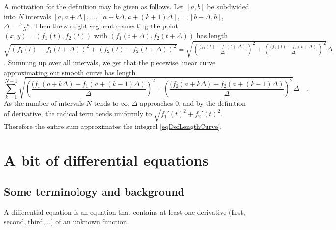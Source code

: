 \documentclass[12pt]{book}
\newcommand{\diff}{\text{d}}
\newcommand{\optionalDisplay}[1]{}
\begin{document}
A motivation for the definition may be given as follows. Let $[a,b]$ be subdivided into $N$ intervals $[a,a+\Delta ], \dots, [a+k\Delta, a+(k+1)\Delta],\dots, [b-\Delta, b]$, $\Delta=\frac{b-a}{N}$. Then the straight segment connecting the point $(x,y)=(f_1(t), f_2(t))$ with $(f_1(t+\Delta), f_2(t+\Delta))$ has length $\sqrt{(f_1(t)-f_1(t+\Delta))^2 + (f_2(t)-f_2(t+\Delta))^2}= \sqrt{\left(\frac{(f_1(t)-f_1(t+\Delta)}{\Delta}\right)^2 + \left(\frac{(f_2(t)- f_2(t+\Delta)}{\Delta} \right)^2}\Delta$. Summing up over all intervals, we get that the piecewise linear curve approximating our smooth curve has length
\[
\sum_{k=1}^{N-1} \sqrt{\left(\frac{(f_1(a+k\Delta)-f_1(a+(k-1)\Delta)}{\Delta}\right)^2 + \left(\frac{(f_2(a+k\Delta)- f_2(a+(k-1)\Delta)}{\Delta} \right)^2}\Delta\quad .
\]
As the number of intervals $N$ tends to $\infty$, $\Delta$ approaches 0, and by the definition of derivative, the radical term tends uniformly to $\sqrt{f_1'(t)^2+f_2'(t)^2}$. Therefore the entire sum approximates the integral \eqref{eqDefLengthCurve}.

\optionalDisplay{
\psset{xunit=1cm,yunit=1cm}
\begin{pspicture}(-1,-1)(4,4.3)
\psaxes[ ticks=none, arrows={->}](0,0)(4,4)
\rput[b](0,4.1){\tiny$y$}
\rput[b](4.1,0){\tiny$x$}

\psplot[linecolor=blue, plotstyle=curve]{0.2}{4} { x 2 div x 180 mul  sin 1 add  mul 1 add x 3 div  sub   }  %
\psplot[linecolor=black!50, plotpoints=11,plotstyle=line]{0.2}{4}{ x 2 div x 180 mul  sin 1 add  mul 1 add x 3 div  sub   } 
\psline[linecolor=red!50](2.1,1.674467844)(2.1,2.650886477)(2.48,2.650886477)
\rput[t](1.9,2.3){\tiny$dy$}
\rput[t](2.28,2.85){\tiny$\diff x$}


\rput[t](1,1.8){\tiny$(x(t), y(t))$}
\pscurve[arrows={->}, linestyle=dotted](1,1.8)(1.3, 1.5)(2.1,1.674467844)
\pscurve[arrows={->}, linestyle=dotted](2,4)(2.5, 3.55)(2.48,2.650886477)

\rput[b](2,4){\tiny$(x(t+\Delta), y(t+\Delta))$}

\end{pspicture}
}

\chapter{A bit of differential equations}
\section{Some terminology and background}
A differential equation is an equation that contains at least one derivative (first, second, third,...) of an unknown function. 
\end{document}
